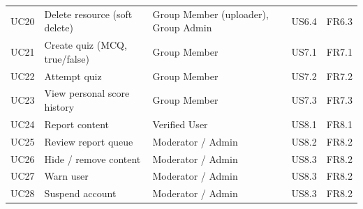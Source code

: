 \documentclass[10pt,a4paper]{article}
\begin{document}
{\begin{longtable}{@{}l >{\raggedright\arraybackslash}p{52mm} >{\raggedright\arraybackslash}p{38mm} l l@{}}
UC20 & Delete resource (soft delete) & Group Member (uploader), Group Admin & US6.4 & FR6.3\\
UC21 & Create quiz (MCQ, true/false) & Group Member & US7.1 & FR7.1\\
UC22 & Attempt quiz & Group Member & US7.2 & FR7.2\\
UC23 & View personal score history & Group Member & US7.3 & FR7.3\\
UC24 & Report content & Verified User & US8.1 & FR8.1\\
UC25 & Review report queue & Moderator / Admin & US8.2 & FR8.2\\
UC26 & Hide / remove content & Moderator / Admin & US8.3 & FR8.2\\
UC27 & Warn user & Moderator / Admin & US8.3 & FR8.2\\
UC28 & Suspend account & Moderator / Admin & US8.3 & FR8.2\\
\bottomrule
\end{longtable}}
\end{document}
